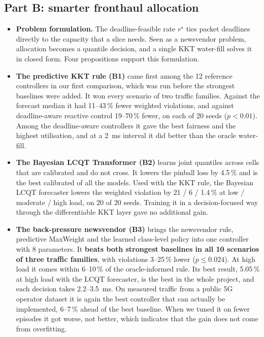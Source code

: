 \subsection*{Part B: smarter fronthaul allocation}
\begin{itemize}
  \item \textbf{Problem formulation.} The deadline-feasible rate $r^\star$ ties packet deadlines directly to the capacity that a slice needs. Seen as a newsvendor problem, allocation becomes a quantile decision, and a single KKT water-fill solves it in closed form. Four propositions support this formulation.
  \item \textbf{The predictive KKT rule (B1)} came first among the 12 reference controllers in our first comparison, which was run before the strongest baselines were added. It won every scenario of two traffic families. Against the forecast median it had 11--43\,\% fewer weighted violations, and against deadline-aware reactive control 19--70\,\% fewer, on each of 20 seeds ($p < 0.01$). Among the deadline-aware controllers it gave the best fairness and the highest utilisation, and at a 2~ms interval it did better than the oracle water-fill.
  \item \textbf{The Bayesian LCQT Transformer (B2)} learns joint quantiles across cells that are calibrated and do not cross. It lowers the pinball loss by 4.5\,\% and is the best calibrated of all the models. Used with the KKT rule, the Bayesian LCQT forecaster lowers the weighted violation by 21 / 6 / 1.4\,\% at low / moderate / high load, on 20 of 20 seeds. Training it in a decision-focused way through the differentiable KKT layer gave no additional gain.
  \item \textbf{The back-pressure newsvendor (B3)} brings the newsvendor rule, predictive MaxWeight and the learned class-level policy into one controller with 8 parameters. It \textbf{beats both strongest baselines in all 10 scenarios of three traffic families}, with violations 3--25\,\% lower ($p \le 0.024$). At high load it comes within 6--10\,\% of the oracle-informed rule. Its best result, 5.05\,\% at high load with the LCQT forecaster, is the best in the whole project, and each decision takes 2.2--3.5~ms. On measured traffic from a public 5G operator dataset it is again the best controller that can actually be implemented, 6--7\,\% ahead of the best baseline. When we tuned it on fewer episodes it got worse, not better, which indicates that the gain does not come from overfitting.
\end{itemize}

